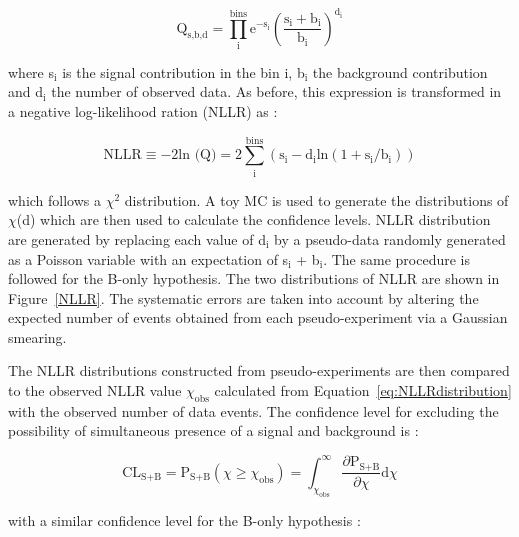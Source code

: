 \documentclass[main.tex]{subfiles}
\begin{document}
\begin{equation}
\text{Q}_{\text{s,b,d}} = \prod^{\text{bins}}_\text{i}  \text{e}^{-\text{s}_\text{i}} \left( \frac{\text{s}_\text{i} + \text{b}_\text{i}}{\text{b}_\text{i}} \right)^{\text{d}_\text{i}}
\end{equation}

\bigskip


\NI where s$_\text{i}$ is the signal contribution in the bin i, b$_\text{i}$ the background contribution and d$_\text{i}$ the number of observed data. As before, this expression is transformed in a negative log-likelihood ration (NLLR) as :


\begin{equation}\label{eq:NLLRdistribution}
\text{NLLR} \equiv -\text{2} \text{ln (Q)} = \text{2} \sum _\text{i}^{\text{bins}} (\text{s}_\text{i}  - \text{d}_\text{i} \text{ln} (1 + \text{s}_\text{i}/\text{b}_\text{i}))
\end{equation}


\bigskip


\NI which follows a $\chi^\text{2}$ distribution. A toy MC is used to generate the distributions of $\chi$(d) which are then used to calculate the confidence levels. NLLR distribution are generated by replacing each value of d$_\text{i}$ by a pseudo-data randomly generated as a Poisson variable with an expectation of s$_\text{i}$ + b$_\text{i}$. The same procedure is followed for the B-only hypothesis. The two distributions of NLLR are shown in Figure~\ref{NLLR}. The systematic errors are taken into account by altering the expected number of events obtained from each pseudo-experiment via a Gaussian smearing.


\bigskip


\NI The NLLR distributions constructed from pseudo-experiments are then compared to the observed NLLR value $\chi_{\text{obs}}$ calculated from Equation~\ref{eq:NLLRdistribution} with the observed number of data events. The confidence level for excluding the possibility  of simultaneous presence of a signal and background is : 


\begin{equation}
\text{CL}_{\text{S+B}} = \text{P}_{\text{S+B}} (\chi \geq \chi_{\text{obs}} ) = \int_{\chi_{\text{obs}}}^{\infty} \frac{\partial \text{P}_{\text{S+B}} }{\partial \chi} 	\text{d}\chi 
\end{equation}


\bigskip


\NI with a similar confidence level for the B-only hypothesis : 
\end{document}
